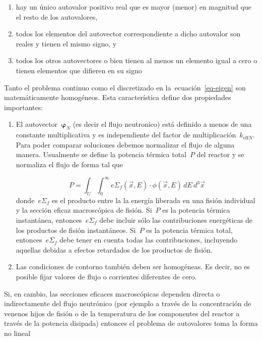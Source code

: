 \documentclass[
  12pt,
  a4paper,
  table]{scrbook}
\providecommand{\tightlist}{%
  \setlength{\itemsep}{0pt}\setlength{\parskip}{0pt}}\usepackage{longtable,booktabs,array}
\theoremstyle{plain}
\theoremstyle{definition}
\theoremstyle{plain}
\theoremstyle{plain}
\theoremstyle{remark}
\begin{document}
\begin{enumerate}
\tightlist
\item
  hay un único autovalor positivo real que es mayor (menor) en magnitud
  que el resto de los autovalores,
\item
  todos los elementos del autovector correspondiente a dicho autovalor
  son reales y tienen el mismo signo, y
\item
  todos los otros autovectores o bien tienen al menos un elemento igual
  a cero o tienen elementos que difieren en su signo
\end{enumerate}

Tanto el problema continuo como el discretizado en
la~ecuación~\ref{eq-eigen} son matemáticamente homogéneos. Esta
característica define dos propiedades importantes:

\begin{enumerate}
\def\labelenumi{\arabic{enumi}.}
\item
  El autovector~\(\symbf{\varphi}_N\) (es decir el flujo neutronico)
  está definido a menos de una constante multiplicativa y es
  independiente del factor de multiplicación~\(k_{\text{eff}N}\). Para
  poder comparar soluciones debemos normalizar el flujo de alguna
  manera. Usualmente se define la potencia térmica total~\(P\) del
  reactor y se normaliza el flujo de forma tal que

  \[
  P = \int_{U} \int_0^\infty e\Sigma_f(\vec{x}, E) \cdot \phi(\vec{x}, E) \, dE \, d^3\vec{x}
  \] donde~\(e\Sigma_f\) es el producto entre la la energía liberada en
  una fisión individual y la sección eficaz macroscópica de fisión.
  Si~\(P\) es la potencia térmica instantánea, entonces~\(e\Sigma_f\)
  debe incluir sólo las contribuciones energéticas de los productos de
  fisión instantáneos. Si~\(P\) es la potencia térmica total,
  entonces~\(e\Sigma_f\) debe tener en cuenta todas las contribuciones,
  incluyendo aquellas debidas a efectos retardados de los productos de
  fisión.
\item
  Las condiciones de contorno también deben ser homogéneas. Es decir, no
  es posible fijar valores de flujo o corrientes diferentes de cero.
\end{enumerate}

Si, en cambio, las secciones eficaces macroscópicas dependen directa o
indirectamente del flujo neutrónico (por ejemplo a través de la
concentración de venenos hijos de fisión o de la temperatura de los
componentes del reactor a través de la potencia disipada) entonces el
problema de autovalores toma la forma no lineal
\end{document}
